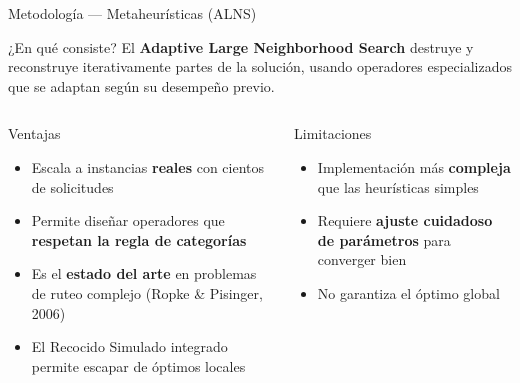\documentclass[10pt, aspectratio=169]{beamer}
\begin{document}
\begin{frame}{Metodología — Metaheurísticas (ALNS)}

  \begin{block}{¿En qué consiste?}
    El \textbf{Adaptive Large Neighborhood Search} destruye y reconstruye iterativamente partes de la solución, usando operadores especializados que se adaptan según su desempeño previo.
  \end{block}

  \vspace{8pt}
  \begin{columns}[T]
      \begin{exampleblock}{\textcolor{verdeok}{Ventajas}}
        \begin{itemize}\setlength\itemsep{5pt}
          \item Escala a instancias \textbf{reales} con cientos de solicitudes
          \item Permite diseñar operadores que \textbf{respetan la regla de categorías}
          \item Es el \textbf{estado del arte} en problemas de ruteo complejo (Ropke \& Pisinger, 2006)
          \item El Recocido Simulado integrado permite escapar de óptimos locales
        \end{itemize}
      \end{exampleblock}

      \begin{alertblock}{\textcolor{rojono}{Limitaciones}}
        \begin{itemize}\setlength\itemsep{5pt}
          \item Implementación más \textbf{compleja} que las heurísticas simples
          \item Requiere \textbf{ajuste cuidadoso de parámetros} para converger bien
          \item No garantiza el óptimo global
        \end{itemize}
      \end{alertblock}
  \end{columns}

\end{frame}
\end{document}
